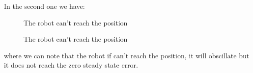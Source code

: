 \documentclass{article}
\begin{document}
\newpage



In the second one we have:

\begin{figure}[H]
    \centering
    \caption{The robot can't reach the position}
    \label{fig:The robot can't reach the position}
\end{figure}

\begin{figure}[H]
    \centering
    \caption{The robot can't reach the position}
    \label{fig:The robot can't reach the positionn}
\end{figure}

where we can note that the robot if can't reach the position, it will obscillate but it does not reach the zero steady state error.
\end{document}
